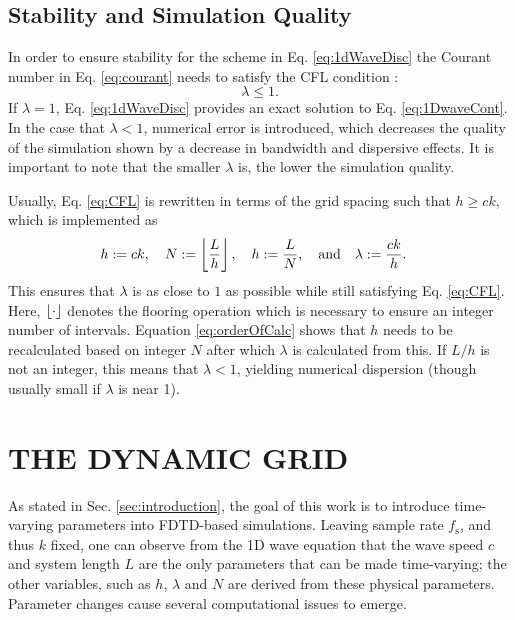 \documentclass[fleqn]{jaes}
\begin{document}
\subsection{Stability and Simulation Quality}\label{sec:quality}
In order to ensure stability for the scheme in Eq. \eqref{eq:1dWaveDisc} the Courant number in Eq. \eqref{eq:courant} needs to satisfy the CFL condition \cite{Courant1928}:
\begin{equation}\label{eq:CFL}
    \lambda \leq 1.
\end{equation}
%
If $\lambda = 1$, Eq. \eqref{eq:1dWaveDisc} provides an exact solution to Eq. \eqref{eq:1DwaveCont}. In the case that $\lambda < 1$, numerical error is introduced, which decreases the quality of the simulation shown by a decrease in bandwidth and dispersive effects. It is important to note that the smaller $\lambda$ is, the lower the simulation quality.

Usually, Eq. \eqref{eq:CFL} is rewritten in terms of the grid spacing such that $h \geq c k$,
which is implemented as
\begin{equation}\label{eq:orderOfCalc}
    \!\!\!\!\!h:=ck, \quad N := \floor[\frac{L}{h}],\quad h := \frac{L}{N},\qaq \lambda := \frac{ck}{h}.
\end{equation}
This ensures that $\lambda$ is as close to $1$ as possible while still satisfying Eq. \eqref{eq:CFL}. Here, $\floor[\cdot]$ denotes the flooring operation which is necessary to ensure an integer number of intervals. Equation \eqref{eq:orderOfCalc} shows that $h$ needs to be recalculated based on integer $N$ after which $\lambda$ is calculated from this. If $L/h$ is not an integer, this means that $\lambda < 1$, yielding numerical dispersion (though usually small if $\lambda$ is near 1).

\section{THE DYNAMIC GRID}\label{sec:dynamicGrid}
As stated in Sec. \ref{sec:introduction}, the goal of this work is to introduce time-varying parameters into FDTD-based simulations. 
Leaving sample rate $f_\text{s}$, and thus $k$ fixed, one can observe from the 1D wave equation that the wave speed $c$ and system length $L$ are the only parameters that can be made time-varying; the other variables, such as $h$, $\lambda$ and $N$ are derived from these physical parameters. Parameter changes cause several computational issues to emerge. 
\end{document}
